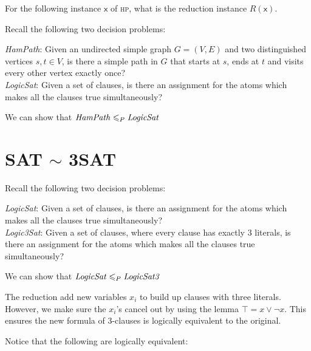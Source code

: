 \frmrule


\begin{example}
For the following instance $\textsf{x}$ of \textsc{hp}, what is
the reduction instance $R(\textsf{x})$. 
\end{example}

\frmrule


\begin{example}
Recall the following two decision problems:

\textit{HamPath}: Given an undirected simple graph $G = (V,E)$ 
and two distinguished vertices $s, t \in V$, 
is there a simple path in $G$ that starts at $s$, ends at $t$ 
and visits every other vertex exactly once?\\
\textit{LogicSat}: Given a set of clauses, is there an 
assignment for the atoms which makes all the clauses true simultaneously?

We can show that $\text{\textit{HamPath}} \leqslant_P \text{\textit{LogicSat}}$
\end{example}




\section{SAT $\sim$ 3SAT}


\begin{example}
Recall the following two decision problems:

\textit{LogicSat}: Given a set of clauses, is there an 
assignment for the atoms which makes all the clauses true simultaneously? \\
\textit{Logic3Sat}: Given a set of clauses, where every clause has exactly 3 literals, 
is there an assignment for the atoms which makes all the clauses true simultaneously?

We can show that $\text{\textit{LogicSat}} \leqslant_P \text{\textit{LogicSat3}}$

\frmrule

The reduction add new variables $x_i$ to build up clauses with three literals.
However, we make sure the  $x_i$'s cancel out by using the lemma $\top = x \vee \neg x$.
This ensures the new formula of 3-clauses is logically equivalent to the original.

Notice that the following are logically equivalent:


\end{example}




